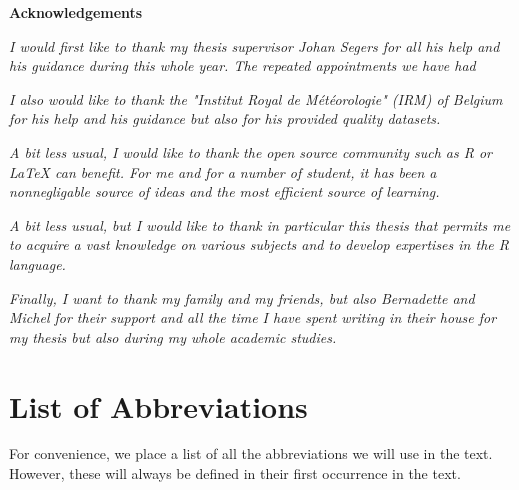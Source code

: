 \documentclass[11pt,a4paper,openany, twosided]{book}
\newcommand\blankpage{%
    \null
    \thispagestyle{empty}%
    \addtocounter{page}{-1}%
    \newpage}
\begin{document}
\newpage




\newenvironment{acknowledgements}%
{\thispagestyle{empty}\null\vfill\begin{center}%
\bfseries Acknowledgements\end{center}}%
{\vfill\null}
\begin{acknowledgements}
	\textit{I would first like to thank my thesis supervisor Johan Segers for all his help and his guidance during this whole year. The repeated appointments we have had   }
	\newline
	
	\textit{I also would like to thank the "Institut Royal de Météorologie" (IRM) of Belgium for his help and his guidance but also for his provided quality datasets.}
	\newline
	
	\textit{A bit less usual, I would like to thank the open source community such as R or LaTeX can benefit. For me and for a number of student, it has been a nonnegligable source of ideas and the most efficient source of learning.  }
	\newline
	
	\textit{A bit less usual, but I would like to thank in particular this thesis that permits me to acquire a vast knowledge on various subjects and to develop expertises in the R language. %
		}
   	\newline
   	
	\textit{Finally, I want to thank my family and my friends, but also Bernadette and Michel for their support and all the time I have spent  writing in their house for my thesis but also during my whole academic studies.}
	
	\thispagestyle{empty}
\end{acknowledgements}


\afterpage{\blankpage}


\thispagestyle{empty}
\dominitoc
\thispagestyle{empty}
\tableofcontents
\thispagestyle{empty}
\newpage
\thispagestyle{empty}
\listoffigures
\thispagestyle{empty}
\listoftables
\thispagestyle{empty}

\newpage


\chapter*{List of Abbreviations}
\thispagestyle{empty}
For convenience, we place a list of all the abbreviations we will use in the text. However, these will always be defined in their first occurrence in the text.\\
\end{document}
